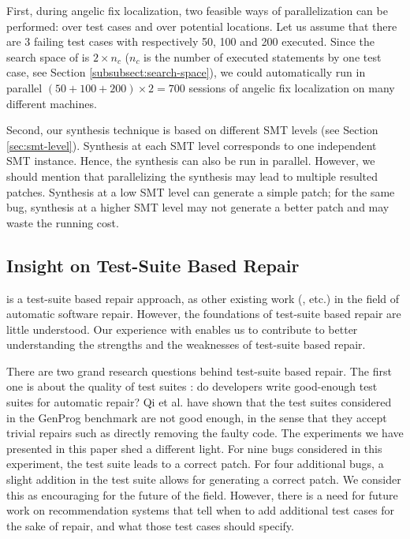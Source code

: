 First, during angelic fix localization, two feasible ways of parallelization can be performed: over test cases and over potential locations. 
Let us assume that there are 3 failing test cases with respectively 50, 100 and 200 \buggyconditions executed. Since the search space of \buggyconditions is $2\times n_c$ ($n_c$ is the number of executed \ourif statements by one test case, see Section \ref{subsubsect:search-space}), we could automatically run in parallel $(50+100+200)\times 2 = 700$ sessions of angelic fix localization on many different machines.

Second, our synthesis technique is based on different SMT levels (see Section \ref{sec:smt-level}). Synthesis at each SMT level corresponds to one independent SMT instance. Hence, the synthesis can also be run in parallel. However, we should mention that parallelizing the synthesis may lead to multiple resulted patches. Synthesis at a low SMT level can generate a simple patch; for the same bug, synthesis at a higher SMT level may not generate a better patch and may waste the running cost. 

\subsection{Insight on Test-Suite Based Repair}
\label{subsect:discussion-repair}

\nopol is a test-suite based repair approach, as other existing work (\cite{le2012genprog,nguyen2013semfix,Kim2013,qi2014strength}, etc.) in the field of automatic software repair.
However, the foundations of test-suite based repair are little understood. Our experience with \nopol enables us to contribute to better understanding the strengths and the weaknesses of test-suite based repair.

There are two grand research questions behind test-suite based repair. The first one is about the quality of test suites \cite{monperrus2014critical}: do developers write good-enough test suites for automatic repair?
Qi et al. \cite{qi2015efficient} have shown that the test suites considered in the GenProg benchmark are not good enough, in the sense that they accept trivial repairs such as directly removing the faulty code. The experiments we have presented in this paper shed a different light. For nine bugs considered in this experiment, the test suite leads to a correct patch. For four additional bugs, a slight addition in the test suite allows for generating a correct patch. We consider this as encouraging for the future of the field. However, there is a need for future work on recommendation systems that tell when to add additional test cases for the sake of repair, and what those test cases should specify.

